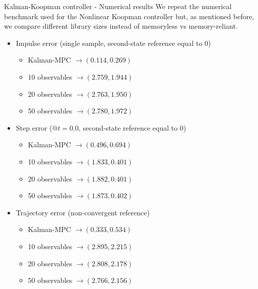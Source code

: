 \documentclass{beamer}
\begin{document}
\begin{frame}[allowframebreaks]{Kalman-Koopman controller - Numerical results}
    We repeat the numerical benchmark used for the Nonlinear Koopman controller but, as mentioned before, we compare different library sizes instead of memoryless vs memory-reliant.

    \begin{itemize}
        \item Impulse error (single sample, second-state reference equal to 0)
            \begin{itemize}
                \item Kalman-MPC $\rightarrow \left(0.114,0.269\right)$
                \item 10 observables $\rightarrow \left(2.759,1.944\right)$
                \item 20 observables $\rightarrow \left(2.763,1.950\right)$
                \item 50 observables $\rightarrow \left(2.780,1.972\right)$
            \end{itemize}
        \item Step error ($@t=0.0$, second-state reference equal to 0)
            \begin{itemize}
                \item Kalman-MPC $\rightarrow \left(0.496,0.694\right)$
                \item 10 observables $\rightarrow \left(1.833,0.401\right)$
                \item 20 observables $\rightarrow \left(1.882,0.401\right)$
                \item 50 observables $\rightarrow \left(1.873,0.402\right)$
            \end{itemize}
        \item Trajectory error (non-convergent reference)
            \begin{itemize}
                \item Kalman-MPC $\rightarrow \left(0.333,0.534\right)$
                \item 10 observables $\rightarrow \left(2.895,2.215\right)$
                \item 20 observables $\rightarrow \left(2.808,2.178\right)$
                \item 50 observables $\rightarrow \left(2.766,2.156\right)$
            \end{itemize}
    \end{itemize}
\end{frame}
\end{document}
